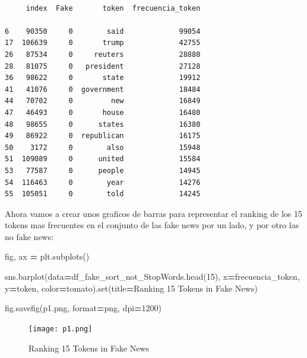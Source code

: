 \documentclass[
  11pt,
  a4paper,
]{article}
\newenvironment{Shaded}{\begin{snugshade}}{\end{snugshade}}
\newcommand{\BuiltInTok}[1]{#1}
\newcommand{\DecValTok}[1]{\textcolor[rgb]{0.00,0.00,0.81}{#1}}
\newcommand{\NormalTok}[1]{#1}
\newcommand{\OperatorTok}[1]{\textcolor[rgb]{0.81,0.36,0.00}{\textbf{#1}}}
\newcommand{\StringTok}[1]{\textcolor[rgb]{0.31,0.60,0.02}{#1}}
\begin{document}
\begin{verbatim}

     index  Fake       token  frecuencia_token
     
6    90350     0        said             99054
17  106639     0       trump             42755
26   87534     0     reuters             28880
28   81075     0   president             27128
36   98622     0       state             19912
41   41076     0  government             18484
44   70702     0         new             16849
47   46493     0       house             16480
48   98655     0      states             16380
49   86922     0  republican             16175
50    3172     0        also             15948
51  109089     0      united             15584
53   77587     0      people             14945
54  116463     0        year             14276
55  105051     0        told             14245
\end{verbatim}

Ahora vamos a crear unos graficos de barras para representar el ranking
de los 15 tokens mas frecuentes en el conjunto de las fake news por un
lado, y por otro las no fake news:

\begin{Shaded}
\begin{Highlighting}[]
\NormalTok{fig, ax }\OperatorTok{=}\NormalTok{ plt.subplots()}

\NormalTok{sns.barplot(data}\OperatorTok{=}\NormalTok{df\_fake\_sort\_not\_StopWords.head(}\DecValTok{15}\NormalTok{), x}\OperatorTok{=}\StringTok{\textquotesingle{}frecuencia\_token\textquotesingle{}}\NormalTok{, y}\OperatorTok{=}\StringTok{\textquotesingle{}token\textquotesingle{}}\NormalTok{, color}\OperatorTok{=}\StringTok{\textquotesingle{}tomato\textquotesingle{}}\NormalTok{).}\BuiltInTok{set}\NormalTok{(title}\OperatorTok{=}\StringTok{\textquotesingle{}Ranking 15 Tokens in Fake News\textquotesingle{}}\NormalTok{) }

\NormalTok{fig.savefig(}\StringTok{\textquotesingle{}p1.png\textquotesingle{}}\NormalTok{, }\BuiltInTok{format}\OperatorTok{=}\StringTok{\textquotesingle{}png\textquotesingle{}}\NormalTok{, dpi}\OperatorTok{=}\DecValTok{1200}\NormalTok{)}
\end{Highlighting}
\end{Shaded}

\begin{figure}
\centering
\texttt{[image: p1.png]}
\caption{Ranking 15 Tokens in Fake News}
\end{figure}
\end{document}
